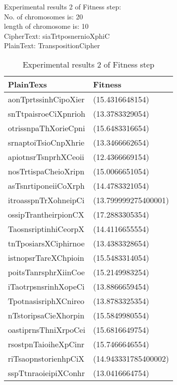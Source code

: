 \textsf{Experimental results 2 of Fitness step:}\\
    \colorbox{blue!30}{\textsf{     No. of chromosomes is: 20}}\\
    \colorbox{blue!30}{\textsf{     length of chromosome is: 10}}\\
    \colorbox{blue!30}{\textsf{     CipherText: siaTrtposnernioXphiC}}\\
    \colorbox{blue!30}{\textsf{     PlainText: TranspositionCipher}}

\begin{table}[H]
\centering
\begin{tabular}{l l}
    \hline
    \cellcolor[gray]{0.9} PlainTexs& \cellcolor[gray]{0.9} Fitness\\ \hline
    aonTprtssinhCipoXier&(15.4316648154)\\ \hline  
snTtpaisroeCiXpnrioh&(13.3783329054)\\ \hline  
otrissnpaThXorieCpni&(15.6483316654)\\ \hline  
srnaptoiTsioCnpXhrie&(13.3466662654)\\ \hline  
apiotnsrTsnprhXCeoii&(12.4366669154)\\ \hline  
nosTrtispaCheioXripn&(15.0066651054)\\ \hline  
asTsnrtiponeiiCoXrph&(14.4783321054)\\ \hline  
itroasspnTrXohneipCi&(13.799999275400001)\\ \hline  
ossipTrantheirpionCX&(17.2883305354)\\ \hline  
TaosnsriptinhiCeorpX&(14.4116655554)\\ \hline  
tnTposiarsXCiphirnoe&(13.4383328654)\\ \hline  
istnopsrTareXChpioin&(15.5483314054)\\ \hline  
poitsTanrsphrXiinCoe&(15.2149983254)\\ \hline  
iTaotrpsnsrinhXopeCi&(13.8866659454)\\ \hline  
TpotnasisriphXCnireo&(13.8783325354)\\ \hline  
nTstoripsaCieXhorpin&(15.5849980554)\\ \hline  
oastiprnsThniXrpoCei&(15.6816649754)\\ \hline  
rsostpnTaioiheXpCinr&(15.7466646554)\\ \hline  
riTsaopnstorienhpCiX&(14.943331785400002)\\ \hline  
sspTtnraoieipiXConhr&(13.0416664754)\\ \hline  
\end{tabular}
\caption{Experimental results 2 of Fitness step}

\end{table}


